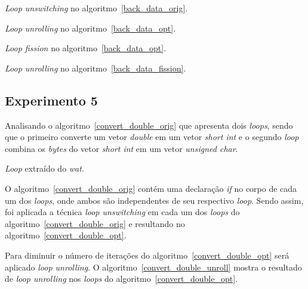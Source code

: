 \begin{algorithm}[H]
\caption{\textit{Loop unswitching} no algoritmo~\ref{back_data_orig}.}
\label{back_data_opt}

\end{algorithm}


\begin{algorithm}[H]
\caption{\textit{Loop unrolling} no algoritmo~\ref{back_data_opt}.}
\label{back_data_unroll}

\end{algorithm}

\begin{algorithm}[H]
\caption{\textit{Loop fission} no algoritmo~\ref{back_data_opt}.}
\label{back_data_fission}

\end{algorithm}

\begin{algorithm}[H]
\caption{\textit{Loop unrolling} no algoritmo~\ref{back_data_fission}.}
\label{back_data_unrofis}

\end{algorithm}
\newpage
\subsection{Experimento 5}

Analisando o algoritmo~\ref{convert_double_orig} que apresenta 
dois \textit{loops},
sendo que o primeiro converte um vetor \textit{double} em um vetor 
\textit{short int} e o segundo \textit{loop} combina os \textit{bytes} do vetor
\textit{short int} em um vetor \textit{unsigned char}.

\begin{algorithm}[H]
  \caption{\textit{Loop} extraído do \textit{wat}.}
\label{convert_double_orig}

\end{algorithm}

O algoritmo~\ref{convert_double_orig} contém uma declaração \textit{if} no corpo de
cada um dos \textit{loops}, onde ambos são independentes de seu respectivo \textit{loop}. 
Sendo assim, foi aplicada a técnica \textit{loop unswitching} em cada um dos
\textit{loops} do algoritmo~\ref{convert_double_orig} e resultando no
algoritmo~\ref{convert_double_opt}.

Para diminuir o número de iterações do algoritmo~\ref{convert_double_opt} será
aplicado \textit{loop unrolling}. O algoritmo~\ref{convert_double_unroll} mostra
o resultado de \textit{loop unrolling} nos \textit{loops} do
algoritmo~\ref{convert_double_opt}.

